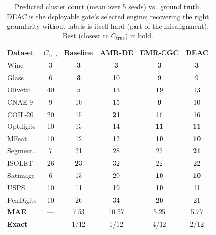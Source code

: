 \begin{table}[!t]
\centering
\caption{Predicted cluster count (mean over 5 seeds) vs.\ ground truth. DEAC is the deployable gate's selected engine; recovering the right granularity without labels is itself hard (part of the misalignment). Best (closest to $C_{\text{true}}$) in bold.}
\label{tab:ccount}
\footnotesize
\setlength{\tabcolsep}{3pt}
\begin{tabular}{lccccc}
\toprule
Dataset & $C_{\text{true}}$ & Baseline & AMR-DE & EMR-CGC & \textbf{DEAC} \\
\midrule
Wine & 3 & \textbf{3} & \textbf{3} & \textbf{3} & \textbf{3} \\
Glass & 6 & \textbf{3} & 10 & 9 & 9 \\
Olivetti & 40 & 5 & 13 & \textbf{19} & 13 \\
CNAE-9 & 9 & 10 & 15 & \textbf{9} & 10 \\
COIL-20 & 20 & 15 & \textbf{21} & 16 & 16 \\
Optdigits & 10 & 13 & 14 & \textbf{11} & \textbf{11} \\
MFeat & 10 & 12 & 12 & \textbf{10} & \textbf{10} \\
Segment. & 7 & 21 & 28 & 23 & \textbf{21} \\
ISOLET & 26 & \textbf{23} & 32 & 22 & 22 \\
Satimage & 6 & 13 & 29 & \textbf{10} & \textbf{10} \\
USPS & 10 & 11 & 19 & \textbf{10} & 11 \\
PenDigits & 10 & 26 & 34 & \textbf{20} & 21 \\
\midrule
\textbf{MAE} & --- & 7.53 & 10.57 & 5.25 & 5.77 \\
\textbf{Exact} & --- & 1/12 & 1/12 & 4/12 & 2/12 \\
\bottomrule
\end{tabular}
\end{table}

